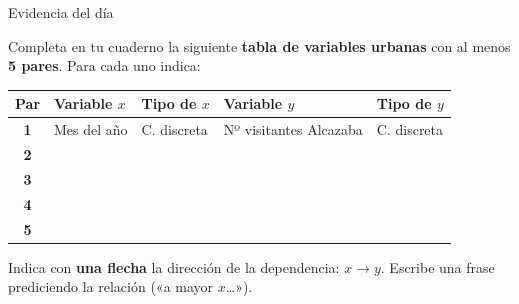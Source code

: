 \documentclass[aspectratio=169, 10pt, spanish]{beamer}
\begin{document}
\begin{frame}{Evidencia del día}
  \begin{evidenciabox}
    Completa en tu cuaderno la siguiente \textbf{tabla de variables urbanas}
    con al menos \textbf{5 pares}. Para cada uno indica:

    \vspace{0.2cm}
    \renewcommand{\arraystretch}{1.3}
    \begin{tabular}{>{\bfseries}c l l l l}
      \toprule
      \textbf{Par} & \textbf{Variable \(x\)} & \textbf{Tipo de \(x\)} &
      \textbf{Variable \(y\)} & \textbf{Tipo de \(y\)} \\
      \midrule
      1 & Mes del año & C. discreta & Nº visitantes Alcazaba & C. discreta \\
      2 & & & & \\
      3 & & & & \\
      4 & & & & \\
      5 & & & & \\
      \bottomrule
    \end{tabular}

    \vspace{0.3cm}
    \AlmFontSmall
    Indica con \textbf{una flecha} la dirección de la dependencia:
    $x \longrightarrow y$.
    Escribe una frase prediciendo la relación («a mayor $x$\ldots»).
  \end{evidenciabox}
\end{frame}
\end{document}
